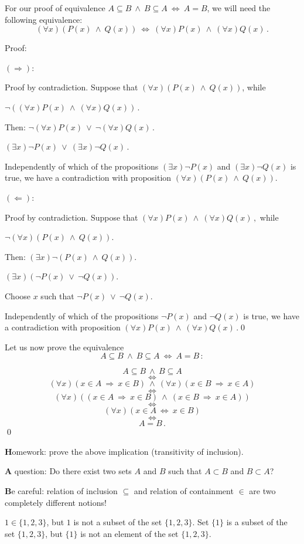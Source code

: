 \documentclass[11pt,paper=b5,footinclude,headinclude]{scrbook} %
\def\ali {{~\vee~}}
\def\inn {{~\wedge~}}
\def\sledi {{~\Rightarrow~}}
\def\cee {{~\Leftrightarrow~}}
\theoremstyle{remark}
\theoremstyle{definition} %
\begin{document}
For our proof of equivalence $A\subseteq B \inn B\subseteq A \cee A = B$, we will need the following
equivalence:
$$(\forall x)(P(x)\inn Q(x))\cee (\forall x)P(x)\inn (\forall x)Q(x)\,.$$

Proof:

$(\Rightarrow)$:

Proof by contradiction.
Suppose that $(\forall x)(P(x)\inn Q(x))$, while

$\neg((\forall x)P(x)\inn (\forall x)Q(x))\,.$

Then:
$\neg(\forall x)P(x)\ali \neg (\forall x)Q(x)\,.$

$(\exists  x)\neg P(x)\ali (\exists x)\neg Q(x)\,.$

Independently of which of the propositions $(\exists  x)\neg P(x)$
and $(\exists  x)\neg Q(x)$ is true, we have a contradiction with proposition
$(\forall x)(P(x)\inn Q(x))$.

$(\Leftarrow)$:

Proof by contradiction.
Suppose that $(\forall x)P(x)\inn (\forall x)Q(x)\,,$ while

$\neg (\forall x)(P(x)\inn Q(x))$.

Then:
$(\exists  x)\neg (P(x)\inn Q(x))$.

$(\exists  x)(\neg P(x)\ali \neg Q(x))$.

Choose $x$ such that $\neg P(x)\ali \neg Q(x)$.

Independently of which of the propositions $\neg P(x)$ and $\neg Q(x)$
is true, we have a contradiction with proposition
$(\forall x)P(x)\inn (\forall x)Q(x)\,.$\qed

\bigskip
Let us now prove the equivalence
$$A\subseteq B \inn B\subseteq A \cee A = B\,:$$

$$A\subseteq B \inn B\subseteq A$$
$$\cee$$
$$(\forall x)(x\in A\sledi x\in B) \inn (\forall x)(x\in B\sledi x\in A)$$
$$\cee$$
$$(\forall x)((x\in A\sledi x\in B) \inn (x\in B\sledi x\in A))$$
$$\cee$$
$$(\forall x)(x\in A\cee x\in B)$$
$$\cee$$
$$A = B\,.$$\qed


{\textbf Homework:} prove the above implication (transitivity of inclusion).

\medskip
{\textbf A question:} Do there exist two sets $A$ and $B$ such that $A\subset B$ and $B\subset A$?

\bigskip
{\textbf Be careful:} relation of inclusion $\subseteq$ and relation of containment $\in$ are two completely different
notions!

$1\in\{1,2,3\}$, but $1$ is not a subset of the set $\{1,2,3\}$.
Set $\{1\}$ is a subset of the set $\{1,2,3\}$, but
$\{1\}$ is not an element of the set $\{1,2,3\}$.
\end{document}

